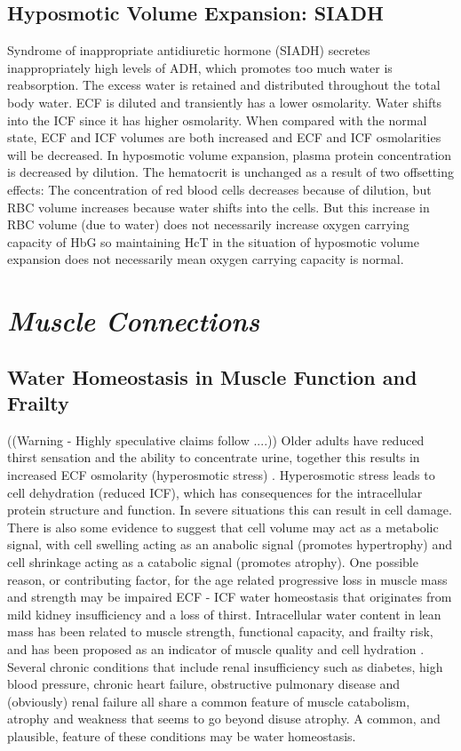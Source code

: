 \subsection{Hyposmotic Volume Expansion: SIADH} 

Syndrome of inappropriate antidiuretic hormone (SIADH) secretes inappropriately high levels of ADH, which promotes too much water is reabsorption. The excess water is retained and distributed throughout the total body water. ECF is diluted and transiently has a lower osmolarity. Water shifts into the ICF since it has higher osmolarity. When compared with the normal state, ECF and ICF volumes are both increased and ECF and ICF osmolarities will be decreased. In hyposmotic volume expansion, plasma protein concentration is decreased by dilution. The hematocrit is unchanged as a result of two offsetting effects: The concentration of red blood cells decreases because of dilution, but RBC volume increases because water shifts into the cells. But this increase in RBC volume (due to water) does not necessarily increase oxygen carrying capacity of HbG so maintaining HcT in the situation of hyposmotic volume expansion does not necessarily mean oxygen carrying capacity is normal.



\section{\textit{Muscle Connections}}

\subsection{Water Homeostasis in Muscle Function and Frailty}
((Warning - Highly speculative claims follow ....)) Older adults have reduced thirst sensation and the ability to concentrate urine, together this results in increased ECF osmolarity (hyperosmotic stress) \cite{lorenzo_role_2019}. Hyperosmotic stress leads to cell dehydration (reduced ICF), which has consequences for the intracellular protein structure and function. In severe situations this can result in cell damage. There is also some evidence to suggest that cell volume may act as a metabolic signal, with cell swelling acting as an anabolic signal (promotes hypertrophy) and cell shrinkage acting as a catabolic signal (promotes atrophy). One possible reason, or contributing factor, for the age related progressive loss in muscle mass and strength may be impaired ECF - ICF water homeostasis that originates from mild kidney insufficiency and a loss of thirst. Intracellular water content in lean mass has been related to muscle strength, functional capacity, and frailty risk, and has been proposed as an indicator of muscle quality and cell hydration \cite{lorenzo_role_2019}. Several chronic conditions that include renal insufficiency such as diabetes, high blood pressure, chronic heart failure, obstructive pulmonary disease and (obviously) renal failure all share a common feature of muscle catabolism, atrophy and weakness that seems to go beyond disuse atrophy. A common, and plausible, feature of these conditions may be water homeostasis. 


